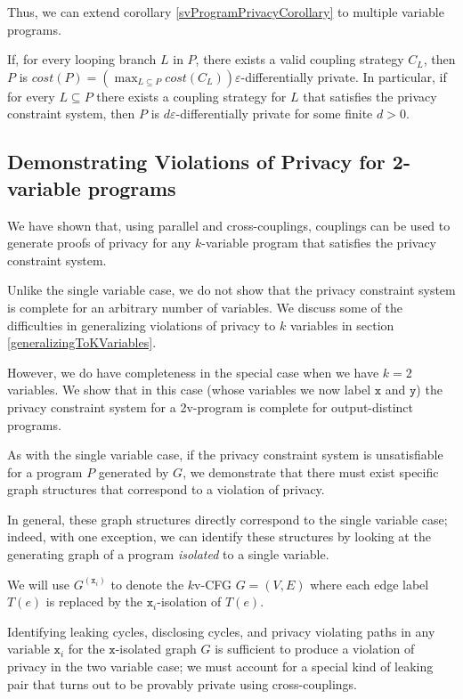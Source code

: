 Thus, we can extend corollary \ref{svProgramPrivacyCorollary} to multiple variable programs. 

\begin{lemma}
    If, for every looping branch $L$ in $P$, there exists a valid coupling strategy $C_L$, then $P$ is $cost(P) = (\max_{L\subseteq P} cost(C_L))\varepsilon$-differentially private. In particular, if for every $L\subseteq P$ there exists a coupling strategy for $L$ that satisfies the privacy constraint system, then $P$ is $d\varepsilon$-differentially private for some finite $d>0$.
\end{lemma}

\subsection{Demonstrating Violations of Privacy for 2-variable programs}

We have shown that, using parallel and cross-couplings, couplings can be used to generate proofs of privacy for any $k$-variable program that satisfies the privacy constraint system. 

Unlike the single variable case, we do not show that the privacy constraint system is complete for an arbitrary number of variables. We discuss some of the difficulties in generalizing violations of privacy to $k$ variables in section \ref{generalizingToKVariables}.

However, we do have completeness in the special case when we have $k=2$ variables. We show that in this case (whose variables we now label $\texttt{x}$ and $\texttt{y}$) the privacy constraint system for a 2v-program is complete for output-distinct programs. 

As with the single variable case, if the privacy constraint system is unsatisfiable for a program $P$ generated by $G$, we demonstrate that there must exist specific graph structures that correspond to a violation of privacy.

In general, these graph structures directly correspond to the single variable case; indeed, with one exception, we can identify these structures by looking at the generating graph of a program \textit{isolated} to a single variable. 

We will use $G^{(\texttt{x}_i)}$ to denote the $k$v-CFG $G = (V, E)$ where each edge label $T(e)$ is replaced by the $\texttt{x}_i$-isolation of $T(e)$. 

Identifying leaking cycles, disclosing cycles, and privacy violating paths in any variable $\texttt{x}_i$ for the $\texttt{x}$-isolated graph $G$ is sufficient to produce a violation of privacy in the two variable case; we must account for a special kind of leaking pair that turns out to be provably private using cross-couplings. 

